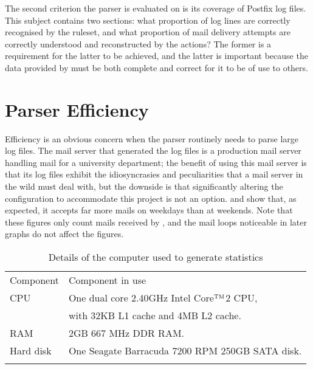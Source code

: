 The second criterion the parser is evaluated on is its coverage of Postfix
log files.  This subject contains two sections: what proportion of log
lines are correctly recognised by the ruleset, and what proportion of mail
delivery attempts are correctly understood and reconstructed by the
actions?  The former is a requirement for the latter to be achieved, and
the latter is important because the data provided by \parsername{} must be
both complete and correct for it to be of use to others.

\section{Parser Efficiency}

\label{parser efficiency}

Efficiency is an obvious concern when the parser routinely needs to parse
large log files.  The mail server that generated the \numberOFlogFILES{}
log files is a production mail server handling mail for a university
department; the benefit of using this mail server is that its log files
exhibit the idiosyncrasies and peculiarities that a mail server in the wild
must deal with, but the downside is that significantly altering the
configuration to accommodate this project is not an option.
 and  show that, as expected, it accepts far more mails on
weekdays than at weekends.  Note that these figures only count mails
received by , and the mail loops noticeable in later graphs
do not affect the figures.



\begin{table}[thbp]
    \caption{Details of the computer used to generate statistics}
    \empty{}\label{Details of the computer used to generate statistics}
    \centering{}
    \begin{tabular}[]{ll}
        \tabletopline{}%
        Component  & Component in use                                   \\
        \tablemiddleline{}%
        CPU         & One dual core 2.40GHz Intel\textregistered{}
                        Core$^{\textsc{TM}}$2 CPU,                      \\
                    & with 32KB L1 cache and 4MB L2 cache.              \\
        RAM         & 2GB 667 MHz DDR RAM\@.                            \\
        Hard disk   & One Seagate Barracuda 7200 RPM 250GB SATA disk.   \\
        \tablebottomline{}%
    \end{tabular}
\end{table}

